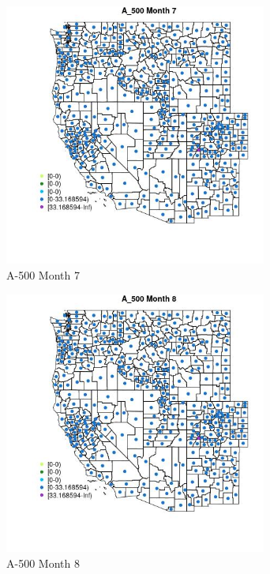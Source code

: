 \begin{figure} 
\centering  
\includegraphics[width=0.77\textwidth]{Code_Outputs/df_report_ML_predictors_CountyCentroid_Locations_Dates_2008-01-01to2018-12-31_MapObsMo7A_500.jpg} 
\caption{\label{fig:df_report_ML_predictors_CountyCentroid_Locations_Dates_2008-01-01to2018-12-31MapObsMo7A_500}A-500 Month 7} 
\end{figure} 
 

\begin{figure} 
\centering  
\includegraphics[width=0.77\textwidth]{Code_Outputs/df_report_ML_predictors_CountyCentroid_Locations_Dates_2008-01-01to2018-12-31_MapObsMo8A_500.jpg} 
\caption{\label{fig:df_report_ML_predictors_CountyCentroid_Locations_Dates_2008-01-01to2018-12-31MapObsMo8A_500}A-500 Month 8} 
\end{figure} 
 

